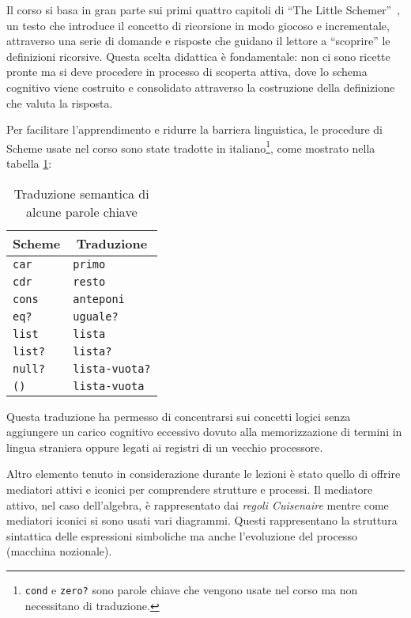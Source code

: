 \documentclass[withtimes]{easychair}
\begin{document}
Il corso si basa in gran parte sui primi quattro capitoli di ``The Little Schemer''~\cite{Friedman1995}, un testo che introduce il concetto di ricorsione in modo giocoso e incrementale, attraverso una serie di domande e risposte che guidano il lettore a ``scoprire'' le definizioni ricorsive. Questa scelta didattica è fondamentale: non ci sono ricette pronte ma si deve procedere in processo di scoperta attiva, dove lo schema cognitivo viene costruito e consolidato attraverso la costruzione della definizione che valuta la risposta.

Per facilitare l'apprendimento e ridurre la barriera linguistica, le procedure di Scheme usate nel corso sono state tradotte in italiano\footnote{\texttt{cond} e \texttt{zero?} sono parole chiave che vengono usate nel corso ma non necessitano di traduzione.}, come mostrato nella tabella \ref{tbl:traduzioni}:

\begin{table}
  \centering
  \begin{tabular}{ll} \toprule
  \multicolumn{1}{c}{Scheme} & \multicolumn{1}{c}{Traduzione}\\\midrule
  \texttt{car} & \texttt{primo} \\
  \texttt{cdr} & \texttt{resto} \\
  \texttt{cons} & \texttt{anteponi} \\
  \texttt{eq?} & \texttt{uguale?} \\
  \texttt{list} & \texttt{lista} \\
  \texttt{list?} & \texttt{lista?} \\
  \texttt{null?} & \texttt{lista-vuota?} \\
  \texttt{\textquotesingle{}()} & \texttt{lista-vuota} \\\bottomrule
  \end{tabular}
  \caption{Traduzione semantica di alcune parole chiave}\label{tbl:traduzioni}
\end{table}

Questa traduzione ha permesso di concentrarsi sui concetti logici senza aggiungere un carico cognitivo eccessivo dovuto alla memorizzazione di termini in lingua straniera oppure legati ai registri di un vecchio processore.

Altro elemento tenuto in considerazione durante le lezioni è stato quello di offrire mediatori attivi e iconici per comprendere strutture e processi. Il mediatore attivo, nel caso dell'algebra, è rappresentato dai \emph{regoli Cuisenaire} mentre come mediatori iconici si sono usati vari diagrammi. Questi rappresentano la struttura sintattica delle espressioni simboliche ma anche l'evoluzione del processo (macchina nozionale).
\end{document}
